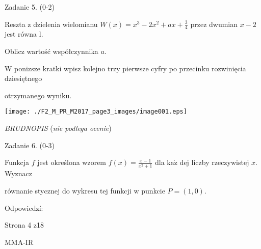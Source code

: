 \documentclass[a4paper,12pt]{article}
\begin{document}
Zadanie 5. (0-2)

Reszta z dzielenia wielomianu $W(x)=x^{3}-2x^{2}+ax+\displaystyle \frac{3}{4}$ przez dwumian $x-2$ jest równa l.

Oblicz wartość współczynnika $a.$

$\mathrm{W}$ ponizsze kratki wpisz kolejno trzy pierwsze cyfry po przecinku rozwinięcia dziesiętnego

otrzymanego wyniku.
\begin{center}
\texttt{[image: ./F2\_M\_PR\_M2017\_page3\_images/image001.eps]}
\end{center}
{\it BRUDNOPIS} ({\it nie podlega ocenie})

Zadanie 6. (0-3)

Funkcja $f$ jest określona wzorem $f(x)=\displaystyle \frac{x-1}{x^{2}+1}$ dla $\mathrm{k}\mathrm{a}\dot{\mathrm{z}}$ dej liczby rzeczywistej $x$. Wyznacz

równanie stycznej do wykresu tej funkcji w punkcie $P=(1,0).$

Odpowiedzí:

Strona 4 z18

MMA-IR
\end{document}
